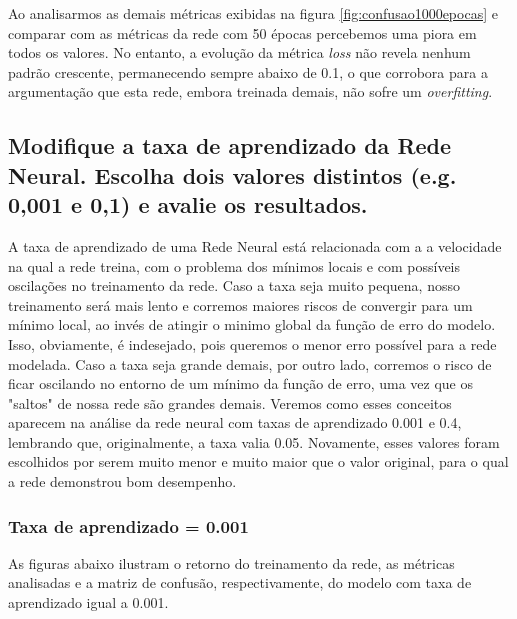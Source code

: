 \documentclass[12pt]{article}
\begin{document}
Ao analisarmos as demais métricas exibidas na figura \ref{fig:confusao1000epocas} e comparar com as métricas da rede com 50 épocas percebemos uma piora em todos os valores. No entanto, a evolução da métrica \textit{loss} não revela nenhum padrão crescente, permanecendo sempre abaixo de 0.1, o que corrobora para a argumentação que esta rede, embora treinada demais, não sofre um \textit{overfitting}.

\subsection{Modifique a taxa de aprendizado da Rede Neural. Escolha dois valores distintos (e.g. 0,001 e 0,1) e avalie os resultados.}

A taxa de aprendizado de uma Rede Neural está relacionada com a a velocidade na qual a rede treina, com o problema dos mínimos locais e com possíveis oscilações no treinamento da rede. Caso a taxa seja muito pequena, nosso treinamento será mais lento e corremos maiores riscos de convergir para um mínimo local, ao invés de atingir o minimo global da função de erro do modelo. Isso, obviamente, é indesejado, pois queremos o menor erro possível para a rede modelada. Caso a taxa seja grande demais, por outro lado, corremos o risco de ficar oscilando no entorno de um mínimo da função de erro, uma vez que os "saltos" de nossa rede são grandes demais. Veremos como esses conceitos aparecem na análise da rede neural com taxas de aprendizado 0.001 e 0.4, lembrando que, originalmente, a taxa valia 0.05. Novamente, esses valores foram escolhidos por serem muito menor e muito maior que o valor original, para o qual a rede demonstrou bom desempenho.

\subsubsection{Taxa de aprendizado = 0.001}

As figuras abaixo ilustram o retorno do treinamento da rede, as métricas analisadas e a matriz de confusão, respectivamente, do modelo com taxa de aprendizado igual a 0.001. 
\end{document}
